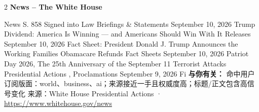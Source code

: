 \documentclass[10.5pt]{ctexart}
\begin{document}
\begin{multicols}{2}
{\large\bfseries News – The White House}\par
News S. 858 Signed into Law Briefings \& Statements September 10, 2026 Trump Dividend: America Is Winning — and Americans Should Win With It Releases September 10, 2026 Fact Sheet: President Donald J. Trump Announces the Working Families Obamacare Refunds Fact Sheets September 10, 2026 Patriot Day 2026, The 25th Anniversary of the September 11 Terrorist Attacks Presidential Actions , Proclamations September 9, 2026 Fi
\textbf{与你有关：} 命中用户订阅版面：world、business、ai；来源接近一手且权威度高；标题/正文包含高信号变化
{\footnotesize\color{ormuted} 来源：White House Presidential Actions · \url{https://www.whitehouse.gov/news}}
\end{multicols}
\end{document}
